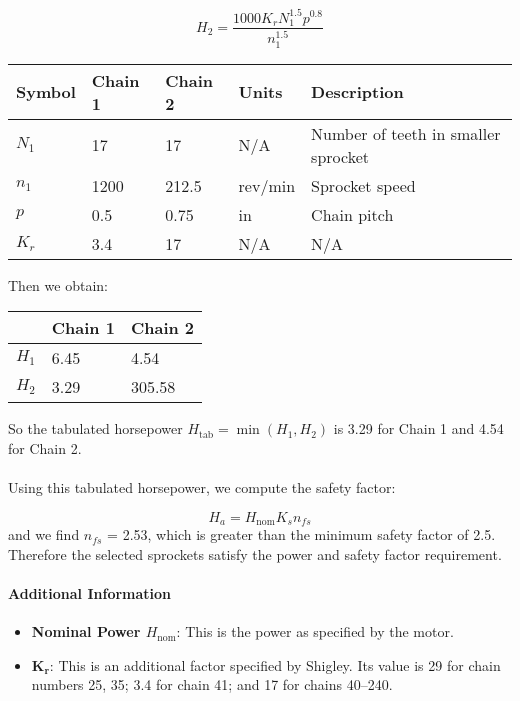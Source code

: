 \documentclass[letterpaper,12pt]{article}
\begin{document}
\begin{equation}
    H_2 = \frac{1000 K_r N_1^{1.5} p^{0.8}}{n_1^{1.5}}
\end{equation}

\begin{center}
	\begin{tabular}{ |p{1.5cm}||p{1.5cm}|p{1.5cm}|p{2cm}|p{7cm}|  }
		\hline
		Symbol & Chain 1 & Chain 2 & Units & Description\\
		\hline
		$N_1$ & 17 & 17 & N/A & Number of teeth in smaller sprocket\\
		$n_1$ & 1200 & 212.5 & rev/min & Sprocket speed  \\
        $p$ & 0.5 & 0.75 & in  & Chain pitch\\			
		$K_r$ & 3.4 & 17 & N/A  & N/A\\
		\hline
	\end{tabular}
\end{center}
Then we obtain:
\begin{center}
	\begin{tabular}{|p{1.5cm}|p{1.5cm}|p{1.5cm}| }
		\hline
		& Chain 1 & Chain 2\\
		\hline
		$H_1$ & 6.45 & 4.54\\
		$H_2$ & 3.29 & 305.58\\
		\hline
	\end{tabular}
\end{center}
So the tabulated horsepower $H_{\text{tab}} = \min(H_1, H_2)$ is 3.29 for Chain 1 and 4.54 for Chain 2.
\\\\
Using this tabulated horsepower, we compute the safety factor:

\begin{equation}
    H_a = H_{\text{nom}} K_s n_{fs} 
\end{equation}
and we find $n_{fs}$ = 2.53, which is greater than the minimum safety factor of 2.5. Therefore the selected sprockets satisfy the power and safety factor requirement.

\paragraph{Additional Information}
\begin{itemize}
    \itemsep0em
    \item \textbf{Nominal Power $H_{\text{nom}}$}: This is the power as specified by the motor.
    \item $\bm{K_r}$: This is an additional factor specified by Shigley. Its value is 29 for chain numbers 25, 35; 3.4 for chain 41; and 17 for chains 40–240.
\end{itemize}
\end{document}
